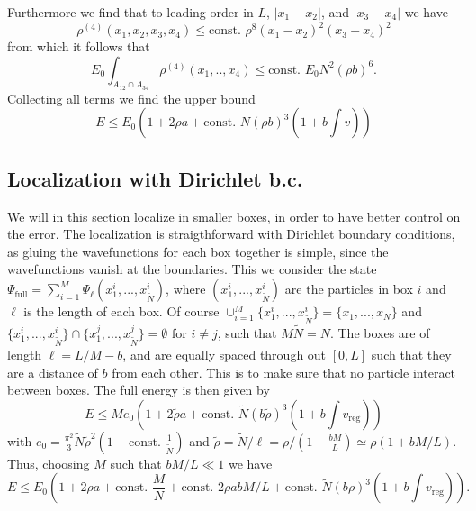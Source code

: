 \documentclass[a4paper,11pt]{article}
\newcommand{\abs}[1]{\left\lvert #1 \right\rvert}
\numberwithin{equation}{section}
\begin{document}
		Furthermore we find that to leading order in $ L $, $ \abs{x_1-x_2} $, and $ \abs{x_3-x_4} $ we have \begin{equation}
		\rho^{(4)}(x_1,x_2,x_3,x_4)\leq \text{const. }\rho^8 (x_1-x_2)^2(x_3-x_4)^2
		\end{equation} from which it follows that \begin{equation}
		E_0\int_{A_{12}\cap A_{34}}\rho^{(4)}(x_1,..,x_4)\leq \text{const. } E_0 N^2(\rho b)^6.
		\end{equation}
		Collecting all terms we find the upper bound \begin{equation}
		E\leq E_0\left(1+2\rho a+ \text{const. }N(\rho b)^3\left(1+b\int v \right)\right)
		\end{equation}
		
	\subsection{Localization with Dirichlet b.c.}
	We will in this section localize in smaller boxes, in order to have better control on the error. The localization is straigthforward with Dirichlet boundary conditions, as gluing the wavefunctions for each box together is simple, since the wavefunctions vanish at the boundaries. This we consider the state $ \Psi_{\text{full}}=\sum_{i=1}^{M}\Psi_{\ell}(x^i_1,...,x^i_{\tilde{N}}) $, where $ (x_1^i,...,x_{\tilde{N}}^i) $ are the particles in box $ i $ and $ \ell $ is the length of each box. Of course $ \cup_{i=1}^{M}\{x_1^i,...,x_{\tilde{N}}^i\}=\{x_1,...,x_N\} $ and $ \{x_1^i,...,x_{\tilde{N}}^i\}\cap\{x_1^j,...,x_{\tilde{N}}^j\}=\emptyset $ for $ i\neq j $, such that $ M\tilde{N}=N $. The boxes are of length $ \ell=L/M-b $, and are equally spaced through out $ [0,L] $ such that they are a distance of $ b $ from each other. This is to make sure that no particle interact between boxes. The full energy is then given by \begin{equation}
	E\leq M e_0\left(1+2\tilde{\rho} a + \text{const. } \tilde{N} (b\tilde{\rho})^3\left(1+b\int v_{\text{reg}}\right)\right)
	\end{equation}
	with $ e_0=\frac{\pi^2}{3}\tilde{N}\tilde{\rho}^2(1+\text{const. }\frac{1}{\tilde{N}}) $ and $ \tilde{\rho}=\tilde{N}/\ell=\rho/(1-\frac{bM}{L})\simeq\rho(1+bM/L) $.
	Thus, choosing $ M $ such that $ bM/L\ll 1 $ we have \begin{equation}
	E\leq E_0\left(1+2\rho a+\text{const. }\frac{M}{N}+\text{const. }2\rho abM/L+\text{const. }\tilde{N}(b\rho)^3\left(1+b\int v_{\text{reg}}\right)\right).
	\end{equation}
\end{document}
